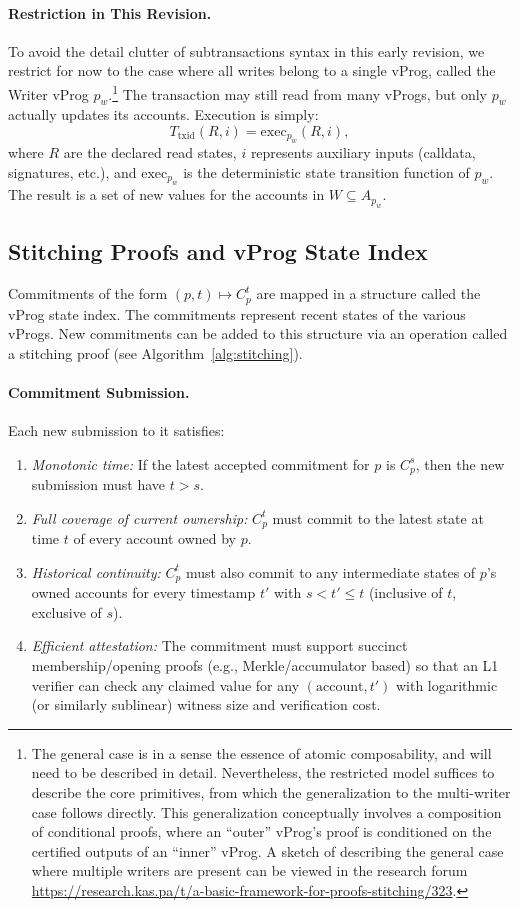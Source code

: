 \documentclass[onecolumn, 9pt, a4paper]{extarticle}
\begin{document}
\paragraph{Restriction in This Revision.} To avoid the detail clutter of subtransactions syntax in this early revision, we restrict for now to the case where all writes belong
to a single vProg, called the Writer vProg $p_w$.\footnote{The general case is in a sense the essence of atomic composability, and will need to be described in detail. Nevertheless, the restricted model suffices to describe the core primitives, from which the generalization to the multi-writer case follows directly. This generalization conceptually involves a composition of conditional proofs, where an ``outer'' vProg's proof is conditioned on the certified outputs of an ``inner'' vProg. A sketch of describing the general case where multiple writers are present can be viewed in the research forum \url{https://research.kas.pa/t/a-basic-framework-for-proofs-stitching/323}.}
The transaction may still read from many vProgs, but only $p_w$
actually updates its accounts. Execution is simply:
\[
T_{\mathrm{txid}}(R,i)=\mathrm{exec}_{p_w}(R,i),
\]
where $R$ are the declared read states, $i$ represents auxiliary inputs (calldata, signatures, etc.), and $\mathrm{exec}_{p_w}$ is the
deterministic state transition function of $p_w$. The result is a set of new values for the accounts in $W\subseteq A_{p_w}$.

\subsection{Stitching Proofs and vProg State Index}\label{sec:proof-submission}
Commitments of the form $(p,t)\mapsto C^t_p$ are mapped in a structure called the vProg state index. The commitments represent recent states of the various vProgs. New commitments can be added to this structure via an operation called a stitching proof (see Algorithm~\ref{alg:stitching}).

\paragraph{Commitment Submission.} 
Each new submission to it satisfies:
\begin{enumerate}[nosep]
  \item \emph{Monotonic time:} If the latest accepted commitment for $p$ is $C^s_p$, then the new submission must have $t>s$.
  \item \emph{Full coverage of current ownership:} $C^t_p$ must commit to the latest state at time $t$ of every account
  owned by $p$.
  \item \emph{Historical continuity:} $C^t_p$ must also commit to any intermediate states of $p$’s owned accounts for every
  timestamp $t'$ with $s<t'\le t$ (inclusive of $t$, exclusive of $s$). 
  \item \emph{Efficient attestation:} The commitment must support succinct membership/opening proofs (e.g., Merkle/accumulator based) so that an L1 verifier can check any claimed value for any $(\text{account},t')$ with logarithmic
  (or similarly sublinear) witness size and verification cost.
\end{enumerate}
\end{document}
